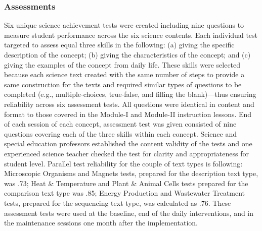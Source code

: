 \documentclass[11.5pt]{sig-alternate} %
\begin{document}
\begin{large}
\subsubsection*{Assessments}
Six unique science achievement tests were created including nine questions to measure student performance across the six science contents. Each individual test targeted to assess equal three skills in the following: (a) giving the specific description of the concept; (b) giving the characteristics of the concept; and (c) giving the examples of the concept from daily life. These skills were selected because each science text created with the same number of steps to provide a same construction for the texts and required similar types of questions to be completed (e.g., multiple-choices, true-false, and filling the blank)—thus ensuring reliability across six assessment tests. All questions were identical in content and format to those covered in the Module-I and Module-II instruction lessons. End of each session of each concept, assessment test was given consisted of nine questions covering each of the three skills within each concept. Science and special education professors established the content validity of the tests and one experienced science teacher checked the test for clarity and appropriateness for student level. Parallel test reliability for the couple of text types is following: Microscopic Organisms and Magnets tests, prepared for the description text type, was .73; Heat \& Temperature and Plant \& Animal Cells tests prepared for the comparison text type was .85; Energy Production and Wastewater Treatment tests, prepared for the sequencing text type, was calculated as .76. These assessment tests were used at the baseline, end of the daily interventions, and in the maintenance sessions one month after the implementation. 


\end{large}
\end{document}
